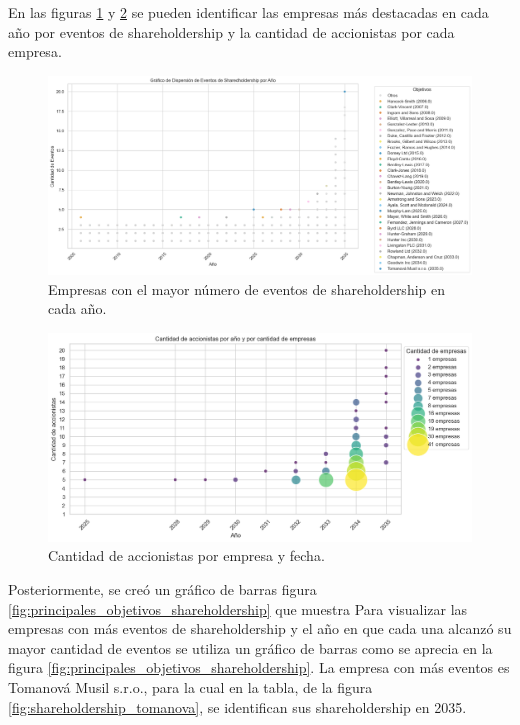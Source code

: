 \documentclass[11pt,spanish,a4paper]{article}
\begin{document}
En las figuras \ref{fig:shareholdership_empresas} y \ref{fig:empresas_numero_shareholders} se pueden identificar las empresas más destacadas en cada año por eventos de shareholdership y la cantidad de accionistas por cada empresa.

\begin{figure}[H]
  \centering
  \includegraphics[width=0.7\linewidth]{graphs/dispersion_sharedholdership_top_anio.png}
  \caption{Empresas con el mayor número de eventos de shareholdership en cada año.}
  \label{fig:shareholdership_empresas}
\end{figure}

\begin{figure}[H]
  \centering
  \includegraphics[width=0.7\linewidth]{graphs/cant_empresas_con_numero_shareholders_anio.png}
  \caption{Cantidad de accionistas por empresa y fecha.}
  \label{fig:empresas_numero_shareholders}
\end{figure}

Posteriormente, se creó un gráfico de barras figura \ref{fig:principales_objetivos_shareholdership} que muestra
Para visualizar las empresas con más eventos de shareholdership y el año en que cada una alcanzó su mayor cantidad de eventos se utiliza un gráfico de barras como se aprecia en la figura \ref{fig:principales_objetivos_shareholdership}. La empresa con más eventos es Tomanová Musil s.r.o., para la cual en la tabla, de la figura \ref{fig:shareholdership_tomanova}, se identifican sus shareholdership en 2035.
\end{document}
